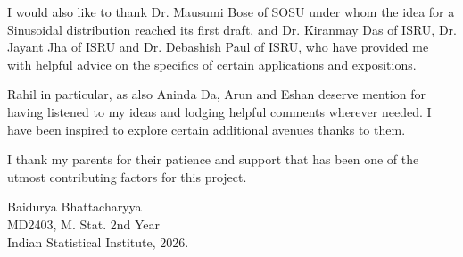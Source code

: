 \documentclass[11pt]{report}
\theoremstyle{plain}
\theoremstyle{remark}
\theoremstyle{definition}
\begin{document}
I would also like to thank Dr. Mausumi Bose of SOSU under whom the idea for a Sinusoidal distribution reached its first draft, and Dr. Kiranmay Das of ISRU, Dr. Jayant Jha of ISRU and Dr. Debashish Paul of ISRU, who have provided me with helpful advice on the specifics of certain applications and expositions.

Rahil in particular, as also Aninda Da, Arun and Eshan deserve mention for having listened to my ideas and lodging helpful comments wherever needed. I have been inspired to explore certain additional avenues thanks to them.

I thank my parents for their patience and support that has been one of the utmost contributing factors for this project.

\begin{flushright}
	Baidurya Bhattacharyya\\
	\footnotesize MD2403, M. Stat. 2nd Year\\
	Indian Statistical Institute, 2026.
\end{flushright}
\end{document}
